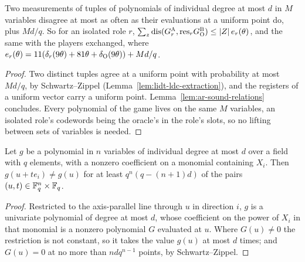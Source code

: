 \begin{lemma}
\label{lem:ar-sound-poly}
\leanok
Two measurements of tuples of polynomials of individual degree at most $d$ in $M$ variables
disagree at most as often as their evaluations at a uniform point do, plus $M d / q$. So for an
isolated role $r$, $\sum_z \mathrm{dis}(G^{\textsc{A}}_r, \mathrm{res}_r G^{\textsc{B}}_{\textsc{O}}) \leq |Z|\,
e_r(\theta)$, and the same with the players exchanged, where
$e_r(\theta) = 11 (\delta_r(9\theta) + 81\theta + \delta_{\textsc{O}}(9\theta)) + M d / q$.
\end{lemma}

\begin{proof}
\leanok
Two distinct tuples agree at a uniform point with probability at most $M d / q$, by
Schwartz--Zippel (Lemma~\ref{lem:lidt-ldc-extraction}), and the registers of a uniform vector carry
a uniform point. Lemma~\ref{lem:ar-sound-relations} concludes. Every polynomial of the game lives on
the same $M$ variables, an isolated role's codewords being the oracle's in the role's slots, so no
lifting between sets of variables is needed.
\end{proof}

\begin{lemma}
\label{lem:ar-sound-shift}
\leanok
Let $g$ be a polynomial in $n$ variables of individual degree at most $d$ over a field with $q$
elements, with a nonzero coefficient on a monomial containing $X_i$. Then $g(u + t e_i) \neq g(u)$
for at least $q^n (q - (n + 1) d)$ of the pairs $(u, t) \in \mathbb{F}_q^n \times \mathbb{F}_q$.
\end{lemma}

\begin{proof}
\leanok
Restricted to the axis-parallel line through $u$ in direction $i$, $g$ is a univariate polynomial
of degree at most $d$, whose coefficient on the power of $X_i$ in that monomial is a nonzero
polynomial $G$ evaluated at $u$. Where $G(u) \neq 0$ the restriction is not constant, so it takes
the value $g(u)$ at most $d$ times; and $G(u) = 0$ at no more than $n d q^{n-1}$ points, by
Schwartz--Zippel.
\end{proof}

